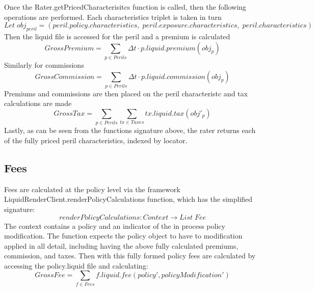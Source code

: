 \documentclass[a4paper,11pt]{article}
\begin{document}
Once the Rater.getPricedCharacterisitcs function is called, then the following operations are performed. Each
characteristics triplet is taken in turn
\begin{equation*}
Let \; obj_{peril} = (peril.policy.characteristics, \; peril.exposure.characteristics, \; peril.characteristics)
\end{equation*}
Then the liquid file is accessed for the peril and a premium is calculated
\begin{equation*}
GrossPremium = \sum_{p \in Perils} \Delta t \cdot p.liquid.premium(obj_p) 
\end{equation*}
Similarly for commissions
\begin{equation*}
GrossCommission = \sum_{p \in Perils} \Delta t \cdot p.liquid.commission(obj_p)
\end{equation*}
Premiums and commissions are then placed on the peril characteristc and tax calculations are made
\begin{equation*}
  GrossTax = \sum_{p \in Perils} \sum_{tx \in Taxes} tx.liquid.tax(obj'_p) 
\end{equation*}
Lastly, as can be seen from the functions signature above, the rater returns each of the fully priced peril characteristics, indexed
by locator.

\subsection{Fees}
Fees are calculated at the policy level via the framework LiquidRenderClient.renderPolicyCalculations function, which has the
simplified signature:
\begin{equation*}
  renderPolicyCalculations: Context \to List \; Fee
\end{equation*}
The context contains a policy and an indicator of the in process policy modification. The function expects the policy object to
have to modification applied in all detail, including having the above fully calculated premiums, commission, and taxes.
Then with this fully formed policy fees are calculated by accessing the policy.liquid file and calculating:
\begin{equation*}
GrossFee = \sum_{f \in Fees} f.liquid.fee(policy', policyModification')
\end{equation*}
\end{document}
